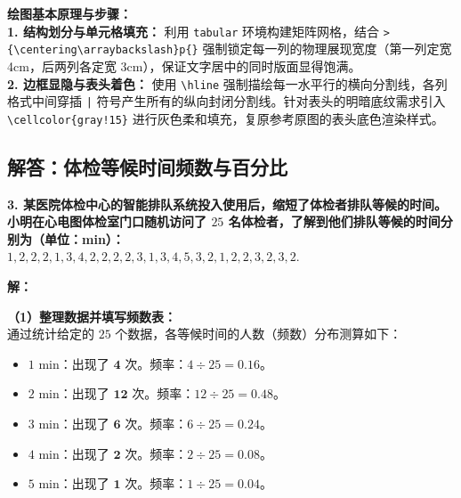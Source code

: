 \vspace{0.6cm}

{\small\color{blue!70!black}
\textbf{绘图基本原理与步骤：}\\
\textbf{1. 结构划分与单元格填充：} 利用 \texttt{tabular} 环境构建矩阵网格，结合 \texttt{>\{\textbackslash centering\textbackslash arraybackslash\}p\{\}} 强制锁定每一列的物理展现宽度（第一列定宽 4cm，后两列各定宽 3cm），保证文字居中的同时版面显得饱满。\\
\textbf{2. 边框显隐与表头着色：} 使用 \texttt{\textbackslash hline} 强制描绘每一水平行的横向分割线，各列格式中间穿插 \texttt{|} 符号产生所有的纵向封闭分割线。针对表头的明暗底纹需求引入 \texttt{\textbackslash cellcolor\{gray!15\}} 进行灰色柔和填充，复原参考原图的表头底色渲染样式。
}

\newpage

\newpage

\subsection{解答：体检等候时间频数与百分比}

\vspace{0.6cm}

\textbf{3. 某医院体检中心的智能排队系统投入使用后，缩短了体检者排队等候的时间。小明在心电图体检室门口随机访问了 $25$ 名体检者，了解到他们排队等候的时间分别为（单位：min）：\\
$1, 2, 2, 2, 1, 3, 4, 2, 2, 2, 2, 3, 1, 3, 4, 5, 3, 2, 1, 2, 2, 3, 2, 3, 2.$}

\vspace{0.4cm}

\textbf{解：}

\textbf{（1）整理数据并填写频数表：} \\
通过统计给定的 $25$ 个数据，各等候时间的人数（频数）分布测算如下：
\begin{itemize}
  \item \textbf{$1\text{ min}$}：出现了 $\boldsymbol{4}$ 次。频率：$4 \div 25 = \boldsymbol{0.16}$。
  \item \textbf{$2\text{ min}$}：出现了 $\boldsymbol{12}$ 次。频率：$12 \div 25 = \boldsymbol{0.48}$。
  \item \textbf{$3\text{ min}$}：出现了 $\boldsymbol{6}$ 次。频率：$6 \div 25 = \boldsymbol{0.24}$。
  \item \textbf{$4\text{ min}$}：出现了 $\boldsymbol{2}$ 次。频率：$2 \div 25 = \boldsymbol{0.08}$。
  \item \textbf{$5\text{ min}$}：出现了 $\boldsymbol{1}$ 次。频率：$1 \div 25 = \boldsymbol{0.04}$。
\end{itemize}

